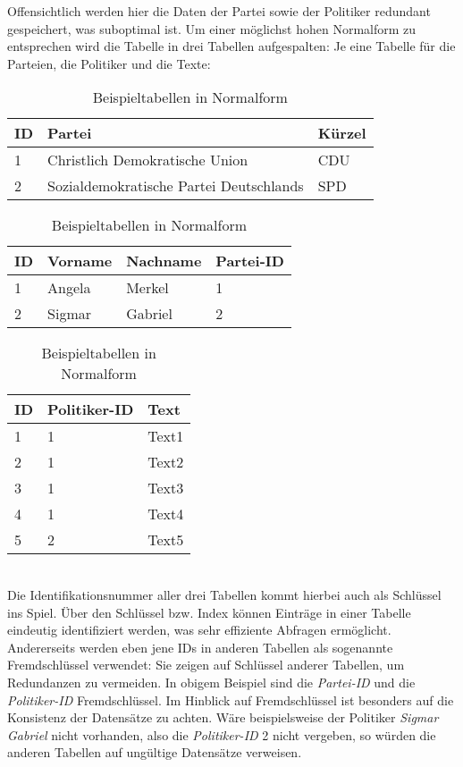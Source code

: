 Offensichtlich werden hier die Daten der Partei sowie der Politiker redundant gespeichert, was suboptimal ist. Um einer möglichst hohen Normalform zu entsprechen wird die Tabelle in drei Tabellen aufgespalten: Je eine Tabelle für die Parteien, die Politiker und die Texte: \newline
\begin{table}
\begin{tabular}{lll}
\hline
ID & Partei & Kürzel \\
\hline
1 & Christlich Demokratische Union & CDU \\
2 & Sozialdemokratische Partei Deutschlands & SPD \\
\hline
\end{tabular}
\newline \newline
\begin{tabular}{llll}
\hline
ID & Vorname & Nachname & Partei-ID\\
\hline
1 & Angela & Merkel & 1\\
2 & Sigmar & Gabriel & 2\\
\hline
\end{tabular}
\newline \newline
\begin{tabular}{lll}
\hline
ID & Politiker-ID & Text \\
\hline
1 & 1 & Text1 \\
2 & 1 & Text2 \\
3 & 1 & Text3 \\
4 & 1 & Text4 \\
5 & 2 & Text5 \\
\hline
\end{tabular}
\caption{Beispieltabellen in Normalform}
\end{table}
\\
Die Identifikationsnummer aller drei Tabellen kommt hierbei auch als Schlüssel ins Spiel. Über den Schlüssel bzw. Index können Einträge in einer Tabelle eindeutig identifiziert werden, was sehr effiziente Abfragen ermöglicht. Andererseits werden eben jene IDs in anderen Tabellen als sogenannte Fremdschlüssel verwendet: Sie zeigen auf Schlüssel anderer Tabellen, um Redundanzen zu vermeiden. In obigem Beispiel sind die \textit{Partei-ID} und die \textit{Politiker-ID} Fremdschlüssel. Im Hinblick auf Fremdschlüssel ist besonders auf die Konsistenz der Datensätze zu achten. Wäre beispielsweise der Politiker \textit{Sigmar Gabriel} nicht vorhanden, also die \textit{Politiker-ID} 2 nicht vergeben, so würden die anderen Tabellen auf ungültige Datensätze verweisen.

